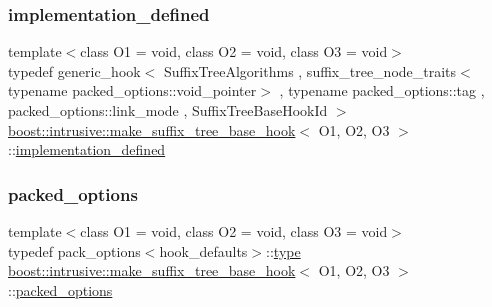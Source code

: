 \subsubsection{\texorpdfstring{implementation\+\_\+defined}{implementation\_defined}}
{\footnotesize\ttfamily template$<$class O1 = void, class O2 = void, class O3 = void$>$ \\
typedef generic\+\_\+hook$<$ Suffix\+Tree\+Algorithms , suffix\+\_\+tree\+\_\+node\+\_\+traits$<$typename packed\+\_\+options\+::void\+\_\+pointer$>$ , typename packed\+\_\+options\+::tag , packed\+\_\+options\+::link\+\_\+mode , Suffix\+Tree\+Base\+Hook\+Id $>$ \hyperlink{classboost_1_1intrusive_1_1make__suffix__tree__base__hook}{boost\+::intrusive\+::make\+\_\+suffix\+\_\+tree\+\_\+base\+\_\+hook}$<$ O1, O2, O3 $>$\+::\hyperlink{classboost_1_1intrusive_1_1make__suffix__tree__base__hook_a21cb881040ae75027aaa684f98669d45}{implementation\+\_\+defined}}

\mbox{\label{classboost_1_1intrusive_1_1make__suffix__tree__base__hook_addb846ee0efa5e8b70f2788c2c6c3381}} 
\subsubsection{\texorpdfstring{packed\+\_\+options}{packed\_options}}
{\footnotesize\ttfamily template$<$class O1 = void, class O2 = void, class O3 = void$>$ \\
typedef pack\+\_\+options$<$hook\+\_\+defaults$>$\+::\hyperlink{classboost_1_1intrusive_1_1make__suffix__tree__base__hook_a72474fe783f53cf3da5ff706894eefd6}{type} \hyperlink{classboost_1_1intrusive_1_1make__suffix__tree__base__hook}{boost\+::intrusive\+::make\+\_\+suffix\+\_\+tree\+\_\+base\+\_\+hook}$<$ O1, O2, O3 $>$\+::\hyperlink{classboost_1_1intrusive_1_1make__suffix__tree__base__hook_addb846ee0efa5e8b70f2788c2c6c3381}{packed\+\_\+options}}

\mbox{\label{classboost_1_1intrusive_1_1make__suffix__tree__base__hook_a72474fe783f53cf3da5ff706894eefd6}} 
